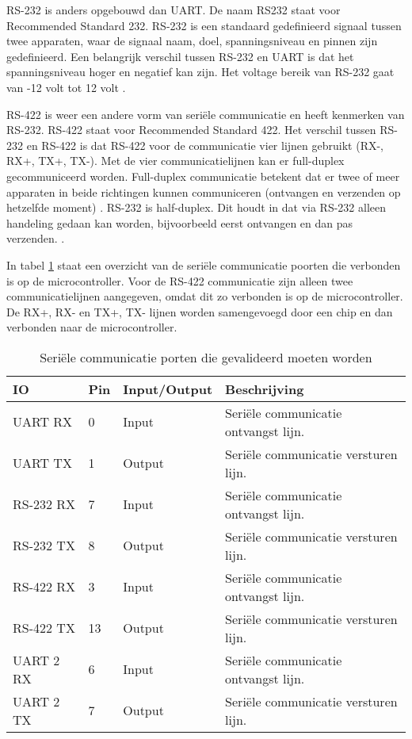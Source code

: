 \noindent RS-232 is anders opgebouwd dan UART. De naam RS232 staat voor Recommended Standard 232. RS-232 is een standaard gedefinieerd signaal tussen twee apparaten, waar de signaal naam, doel, spanningsniveau en pinnen zijn gedefinieerd. Een belangrijk verschil tussen RS-232 en UART is dat het spanningsniveau hoger en negatief kan zijn. Het voltage bereik van RS-232 gaat van -12 volt tot 12 volt \autocite{RS232}. \newline

\noindent RS-422 is weer een andere vorm van seriële communicatie en heeft kenmerken van RS-232. RS-422 staat voor Recommended Standard 422. Het verschil tussen RS-232 en RS-422 is dat RS-422 voor de communicatie vier lijnen gebruikt (RX-, RX+, TX+, TX-). Met de vier communicatielijnen kan er full-duplex gecommuniceerd worden. Full-duplex communicatie betekent dat er twee of meer apparaten in beide richtingen kunnen communiceren (ontvangen en verzenden op hetzelfde moment) \autocite{FullDuplex}. RS-232 is half-duplex. Dit houdt in dat via RS-232 alleen handeling gedaan kan worden, bijvoorbeeld eerst ontvangen en dan pas verzenden. \autocite{RS422}. \newline

\noindent In tabel \ref{tab:hw_val_serieel} staat een overzicht van de seriële communicatie poorten die verbonden is op de microcontroller. Voor de RS-422 communicatie zijn alleen twee communicatielijnen aangegeven, omdat dit zo verbonden is op de microcontroller. De RX+, RX- en TX+, TX- lijnen worden samengevoegd door een chip en dan verbonden naar de microcontroller.
\begin{table}[h!]
	\caption{Seriële communicatie porten die gevalideerd moeten worden}
	\begin{tabular}{lllp{9cm}}
	\toprule
\textbf{IO} & \textbf{Pin} & \textbf{Input/Output} & \textbf{Beschrijving}	\\ \toprule
	UART RX		& 0    	& Input		& Seriële communicatie ontvangst lijn.			\\
	UART TX		& 1    	& Output	& Seriële communicatie versturen lijn.			\\
	RS-232 RX	& 7    	& Input		& Seriële communicatie ontvangst lijn.			\\
	RS-232 TX	& 8    	& Output	& Seriële communicatie versturen lijn.			\\
	RS-422 RX	& 3    	& Input		& Seriële communicatie ontvangst lijn.			\\
	RS-422 TX	& 13   	& Output	& Seriële communicatie versturen lijn.			\\
	UART 2 RX	& 6    	& Input		& Seriële communicatie ontvangst lijn.			\\
	UART 2 TX	& 7   	& Output	& Seriële communicatie versturen lijn.			\\ \bottomrule
	\end{tabular}
	\label{tab:hw_val_serieel}
\end{table}